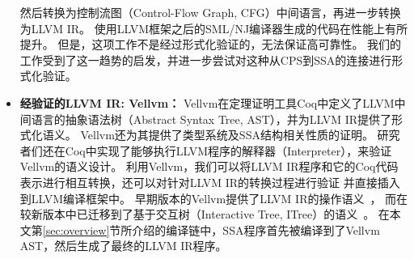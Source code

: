 \begin{itemize}
    然后转换为控制流图（Control-Flow Graph, CFG）中间语言，再进一步转换为LLVM IR。
    使用LLVM框架之后的SML/NJ编译器生成的代码在性能上有所提升。
    但是，这项工作不是经过形式化验证的，无法保证高可靠性。
    我们的工作受到了这一趋势的启发，并进一步尝试对这种从CPS到SSA的连接进行形式化验证。
    \item \textbf{经验证的LLVM IR: Vellvm：} 
    Vellvm在定理证明工具Coq中定义了LLVM中间语言的抽象语法树（Abstract Syntax Tree, AST），并为LLVM IR提供了形式化语义。
    Vellvm还为其提供了类型系统及SSA结构相关性质的证明。
    研究者们还在Coq中实现了能够执行LLVM程序的解释器（Interpreter），来验证Vellvm的语义设计。
    利用Vellvm，我们可以将LLVM IR程序和它的Coq代码表示进行相互转换，还可以对针对LLVM IR的转换过程进行验证
    并直接插入到LLVM编译框架中。
    早期版本的Vellvm提供了LLVM IR的操作语义~\cite{zhao2012formalizing}，
    而在较新版本中已迁移到了基于交互树（Interactive Tree, ITree）的语义~\cite{zakowski2021modular}。
    在本文第\ref{sec:overview}节所介绍的编译链中，SSA程序首先被编译到了Vellvm AST，然后生成了最终的LLVM IR程序。
\end{itemize}
